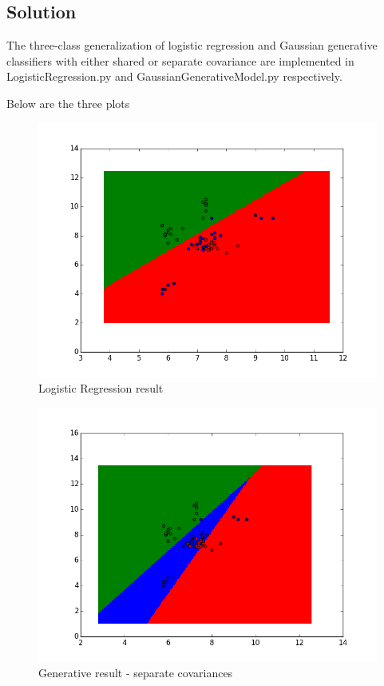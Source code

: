 \documentclass[submit]{harvardml}
\begin{document}
\subsection*{Solution}

The three-class generalization of logistic regression and Gaussian generative classifiers with either shared or separate covariance are implemented in LogisticRegression.py and GaussianGenerativeModel.py respectively.

Below are the three plots

\begin{figure}[h]
    \centering
    \includegraphics[width=400pt]{logistic_regression_result}
    \caption{Logistic Regression result}
\end{figure}

\begin{figure}[h]
    \centering
    \includegraphics[width=400pt]{generative_result_separate_covariances}
    \caption{Generative result - separate covariances}
\end{figure}
\end{document}
